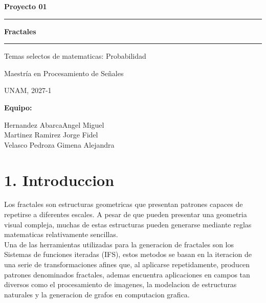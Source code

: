 \documentclass[12pt,a4paper]{article}
\begin{document}
\begin{titlepage}
\centering
\vspace*{1.5cm}

{\Large\textbf{Proyecto 01}\par}

\vspace{0.5cm}
\rule{10cm}{0.3pt}

\vspace{1.5cm}

{\LARGE\textbf{Fractales}\par}

\vspace{0.5cm}
\rule{10cm}{0.3pt}

\vspace{2cm}

{\Large Temas selectos de matematicas: Probabilidad \par}

\vspace{0.3cm}
{\large Maestría en Procesamiento de Señales\par}
{\large UNAM, 2027-1\par}


\vspace{4cm}

{\Large\textbf{Equipo:}\par}
\vspace{0.5cm}
Hernandez AbarcaAngel Miguel \\
\vspace{0.3cm}
Martinez Ramirez Jorge Fidel \\
\vspace{0.3cm}
Velasco Pedroza Gimena Alejandra

\vspace{2cm}

\end{titlepage}


\newpage
\section*{1. Introduccion}

Los fractales son estructuras geometricas que presentan patrones capaces de repetirse a diferentes escales. A pesar de que pueden presentar una geometria visual compleja, muchas de estas estructuras pueden generarse mediante reglas matematicas relativamente sencillas. \\

Una de las herramientas utilizadas para la generacion de fractales son los Sistemas de funciones iteradas (IFS), estos metodos se basan en la iteracion de una serie de transformaciones afines que, al aplicarse repetidamente, producen patrones denominados fractales, ademas encuentra aplicaciones en campos tan diversos como el procesamiento de imagenes, la modelacion de estructuras naturales y la generacion de grafos en computacion grafica. \\
\end{document}
